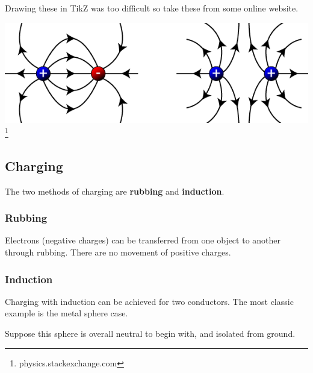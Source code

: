 \documentclass[../main.tex]{subfiles}
\begin{document}
		Drawing these in TikZ was too difficult so take these from some online website.
		\begin{center}
			\includegraphics[width=\linewidth]{graphics/electrostaticsFieldLines}\footnote{physics.stackexchange.com}
		\end{center}
	
		\subsection{Charging}
		The two methods of charging are \textbf{rubbing} and \textbf{induction}.
		
		\subsubsection{Rubbing}
		Electrons (negative charges) can be transferred from one object to another through rubbing. There are no movement of positive charges.
		
		\subsubsection{Induction}
		Charging with induction can be achieved for two conductors. The most classic example is the metal sphere case.
		\begin{center}
		\end{center} 
		Suppose this sphere is overall neutral to begin with, and isolated from ground.
		
\end{document}
